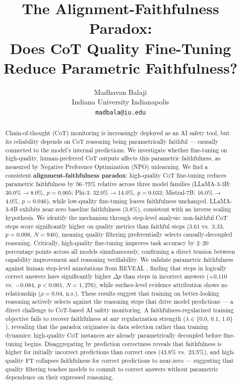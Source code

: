 \documentclass[11pt]{article}
\title{The Alignment-Faithfulness Paradox:\\
Does CoT Quality Fine-Tuning Reduce Parametric Faithfulness?}
\author{
  Madhavan Balaji \\
  Indiana University Indianapolis \\
  \texttt{madbala@iu.edu}
}
\begin{document}
\maketitle

\begin{abstract}
Chain-of-thought (CoT) monitoring is increasingly deployed as
an AI safety tool, but its reliability depends on CoT reasoning
being parametrically faithful --- causally connected to the model's
internal predictions. We investigate whether fine-tuning on
high-quality, human-preferred CoT outputs affects this parametric
faithfulness, as measured by Negative Preference Optimization
(NPO) unlearning. We find a consistent \textbf{alignment-faithfulness
paradox}: high-quality CoT fine-tuning reduces parametric
faithfulness by 56--75\% relative across three model families
(LLaMA-3-3B: 30.0\%$\to$8.0\%, $p{=}0.005$;
Phi-3: 32.0\%$\to$14.0\%, $p{=}0.033$;
Mistral-7B: 16.0\%$\to$4.0\%, $p{=}0.046$),
while low-quality fine-tuning leaves faithfulness unchanged.
LLaMA-3-8B exhibits near-zero baseline faithfulness (3.8\%),
consistent with an inverse scaling hypothesis. We identify the mechanism through
step-level analysis: non-faithful CoT steps score significantly
higher on quality metrics than faithful steps (3.61 vs.\ 3.33,
$p{=}0.008$, $N{=}940$), meaning quality filtering
preferentially selects causally-decoupled reasoning.
Critically, high-quality fine-tuning improves task accuracy
by 2--20 percentage points across all models simultaneously,
confirming a direct tension between capability improvement
and reasoning verifiability.
We validate parametric faithfulness against human step-level
annotations from REVEAL \citep{jacovi2025reveal}, finding that
steps in logically correct answers have significantly higher
$\Delta p$ than steps in incorrect answers ($+0.110$
vs.\ $-0.084$, $p{<}0.001$, $N{=}1{,}276$), while
surface-level evidence attribution shows no relationship
($\rho{=}0.04$, n.s.). These results suggest that training on
better-looking reasoning actively selects against the reasoning
steps that drive model predictions --- a direct challenge to
CoT-based AI safety monitoring.
A faithfulness-regularized training objective fails to recover faithfulness at
any regularization strength ($\lambda \in \{0.0,\,0.1,\,1.0\}$), revealing
that the paradox originates in data selection rather than training dynamics:
high-quality CoT instances are already parametrically decoupled before
fine-tuning begins.
Disaggregating by prediction correctness reveals that
faithfulness is higher for initially incorrect predictions than correct ones
(43.8\% vs.\ 23.5\%), and high-quality FT collapses faithfulness for
correct predictions to near-zero --- suggesting that quality filtering
teaches models to commit to correct answers without parametric dependence
on their expressed reasoning.
\end{abstract}
\end{document}
